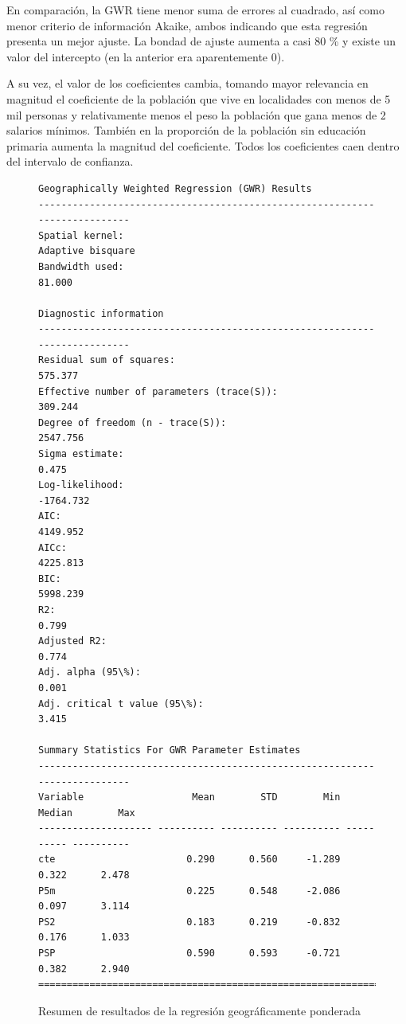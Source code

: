 \documentclass[12pt,letterpaper]{article}
\begin{document}
En comparación, la GWR tiene menor suma de errores al cuadrado, así como menor criterio de información Akaike, ambos indicando que esta regresión presenta un mejor ajuste. La bondad de ajuste aumenta a casi 80 \% y existe un valor del intercepto (en la anterior era aparentemente 0).

A su vez, el valor de los coeficientes cambia, tomando mayor relevancia en magnitud el coeficiente de la población que vive en localidades con menos de 5 mil personas y relativamente menos el peso la población que gana menos de 2 salarios mínimos. También en la proporción de la población sin educación primaria aumenta la magnitud del coeficiente. Todos los coeficientes caen dentro del intervalo de confianza. 

\begin{figure}[H]
\begin{Verbatim}[baselinestretch=1]
Geographically Weighted Regression (GWR) Results
---------------------------------------------------------------------------
Spatial kernel:                                           Adaptive bisquare
Bandwidth used:                                                      81.000

Diagnostic information
---------------------------------------------------------------------------
Residual sum of squares:                                            575.377
Effective number of parameters (trace(S)):                          309.244
Degree of freedom (n - trace(S)):                                  2547.756
Sigma estimate:                                                       0.475
Log-likelihood:                                                   -1764.732
AIC:                                                               4149.952
AICc:                                                              4225.813
BIC:                                                               5998.239
R2:                                                                   0.799
Adjusted R2:                                                          0.774
Adj. alpha (95\%):                                                    0.001
Adj. critical t value (95\%):                                         3.415

Summary Statistics For GWR Parameter Estimates
---------------------------------------------------------------------------
Variable                   Mean        STD        Min     Median        Max
-------------------- ---------- ---------- ---------- ---------- ----------
cte                       0.290      0.560     -1.289      0.322      2.478
P5m                       0.225      0.548     -2.086      0.097      3.114
PS2                       0.183      0.219     -0.832      0.176      1.033
PSP                       0.590      0.593     -0.721      0.382      2.940
===========================================================================
\end{Verbatim}
\caption{Resumen de resultados de la regresión geográficamente ponderada}
\end{figure}
\end{document}
